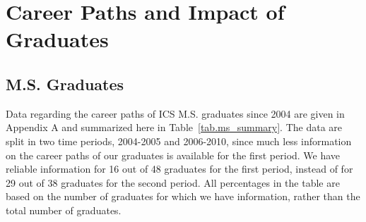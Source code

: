 \documentclass[12pt]{article}
\begin{document}
\newpage


\section{Career Paths and Impact of Graduates}
\label{sec.paths}

\subsection{M.S. Graduates}
\label{sec.paths.ms}

Data regarding the career paths of ICS M.S. graduates since 2004 are
given in Appendix A and summarized here in
Table~\ref{tab.ms_summary}. The data are split in two time periods,
2004-2005 and 2006-2010, since much less information on the career
paths of our graduates is available for the first period. We have
reliable information for 16 out of
48 graduates for the first period, instead of for
29 out of 38 graduates for the second period. All percentages in
the table are based on the number of graduates for which we have
information, rather than the total number of graduates.
\end{document}
